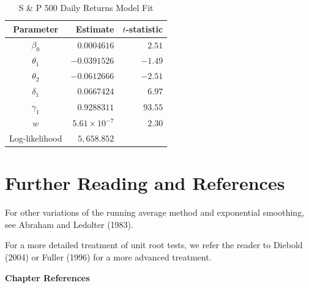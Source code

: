 \bigskip


\begin{table}[h]
 \caption{\label{T9:SandPDaily} S \& P 500 Daily
Returns Model Fit}
\begin{center}
\begin{tabular}{crr}
\hline Parameter & Estimate & $t$-statistic \\ \hline
$\beta_0$ & $0.0004616$ & $2.51$ \\
$\theta_1$ & $-0.0391526$ & $-1.49$ \\
$\theta_2$ & $-0.0612666$ & $-2.51$ \\
$\delta_1$ & $0.0667424$ & $6.97$ \\
$\gamma_1$ & $0.9288311$ & $93.55$ \\
$w$ & $5.61\times 10^{-7}$ & $2.30$ \\
Log-likelihood & $5,658.852$ &  \\ \hline
\end{tabular}\end{center}
 \end{table}

\linejed

\bigskip

\section{Further Reading and References}

For other variations of the running average method and exponential
smoothing, see Abraham and Ledolter (1983).


For a more detailed treatment of unit root tests, we refer the
reader to Diebold (2004) or Fuller (1996) for a more advanced
treatment.

\bigskip

\textbf{Chapter References}

